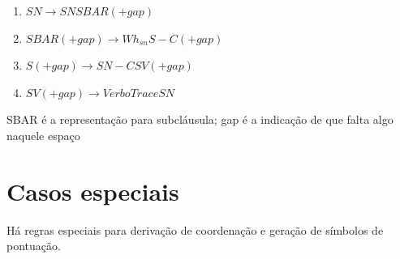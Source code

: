 \begin{enumerate}
  \item $SN \rightarrow SN SBAR(+gap)$
  \item $SBAR(+gap) \rightarrow Wh_{sn} S-C(+gap)$
  \item $S(+gap) \rightarrow SN-C SV(+gap)$
  \item $SV(+gap) \rightarrow Verbo Trace SN$
\end{enumerate}



SBAR é a representação para subcláusula; gap é a indicação de que falta algo naquele espaço



\section{Casos especiais}
\label{sec:modelo3_casos_especiais}

Há regras especiais para derivação de coordenação e geração de símbolos de pontuação.